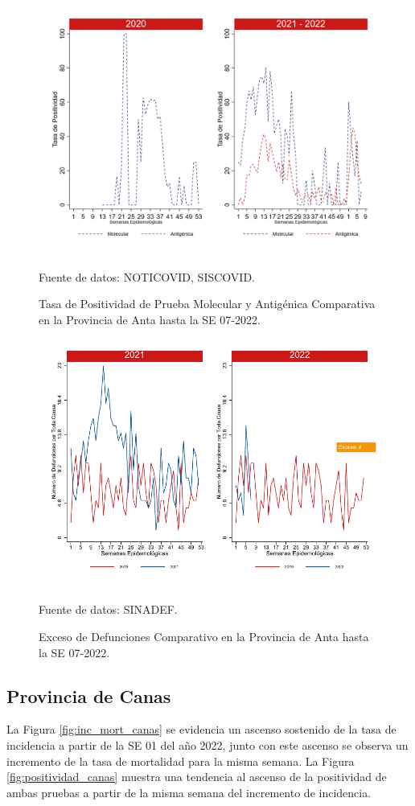 \documentclass[12pt,a4paper,openany]{book}
\begin{document}
		\begin{figure}[h]
			\caption{Tasa de Positividad de Prueba Molecular y Antigénica Comparativa en la Provincia de Anta hasta la SE 07-2022.}\label{fig:positividad_anta}
			\begin{center}
				\includegraphics[width=0.7\linewidth]{../figuras/positividad_20_21_2.png}
			\end{center}
			{\footnotesize {Fuente de datos: NOTICOVID, SISCOVID.}}
		\end{figure}
		
		\begin{figure}[h]
			\caption{Exceso de Defunciones Comparativo en la Provincia de Anta hasta la SE 07-2022.}\label{fig:exceso_anta}
			\begin{center}
				\includegraphics[width=0.7\linewidth]{../figuras/exceso_2.pdf}
			\end{center}
			{\footnotesize {Fuente de datos: SINADEF.}}
		\end{figure}
		
		\clearpage
		
		\subsection*{Provincia de Canas}
		\noindent La Figura \ref{fig:inc_mort_canas} se evidencia un ascenso sostenido de la tasa de incidencia a partir de la SE 01 del año 2022, junto con este ascenso se observa un incremento de la tasa de mortalidad para la misma semana. 
		\noindent La Figura \ref{fig:positividad_canas} muestra una tendencia al ascenso de la positividad de ambas pruebas a partir de la misma semana del incremento de incidencia. 
		
\end{document}
